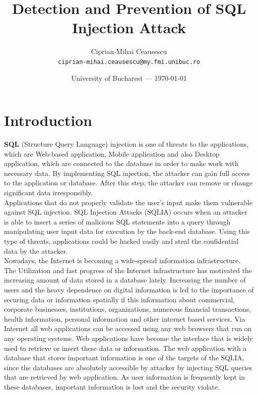 \documentclass{article}
\title{Detection and Prevention of SQL Injection Attack} %
\author{Ciprian-Mihai Ceausescu\\ \texttt{ciprian-mihai.ceausescu@my.fmi.unibuc.ro}} %
\date{University of Bucharest --- \today} %
\begin{document}
\maketitle %


\section*{Introduction}
\hspace{10mm}\textbf{SQL} (Structure Query Language) injection is one of threats to the applications, which are Web-based
application, Mobile application and also Desktop application, which are connected to the database in order to make work with necessary data. By implementing SQL injection, the attacker can gain full access to the application or database. After this step, the attacker can remove or change significant data irresponsibly.
\\ \hspace*{10mm}Applications that do not properly validate the user’s input make them vulnerable against SQL injection. SQL Injection Attacks (SQLIA) occurs when an attacker is able to insert a series of malicious SQL statements into a query through manipulating user input data for execution by the back-end database. Using this type of threats, applications could be hacked easily and steal the confidential data by the attacker.
\\ \hspace*{10mm}Nowadays, the Internet is becoming a wide-spread information infrastructure. The Utilization and fast progress of
the Internet infrastructure has motivated the increasing amount of data stored in a database lately. Increasing the
number of users and the heavy dependence on digital information is led to the importance of securing data or
information spatially if this information about commercial, corporate businesses, institutions, organizations,
numerous financial transactions, health information, personal information and other internet based services. Via
Internet all web applications can be accessed using any web browsers that run on any operating systems. Web
applications have become the interface that is widely used to retrieve or insert these data or information. The
web application with a database that stores important information is one of the targets of the SQLIA, since the
databases are absolutely accessible by attacker by injecting SQL queries that are retrieved by web application. As
user information is frequently kept in these databases, important information is lost and the security violate.
\end{document}
